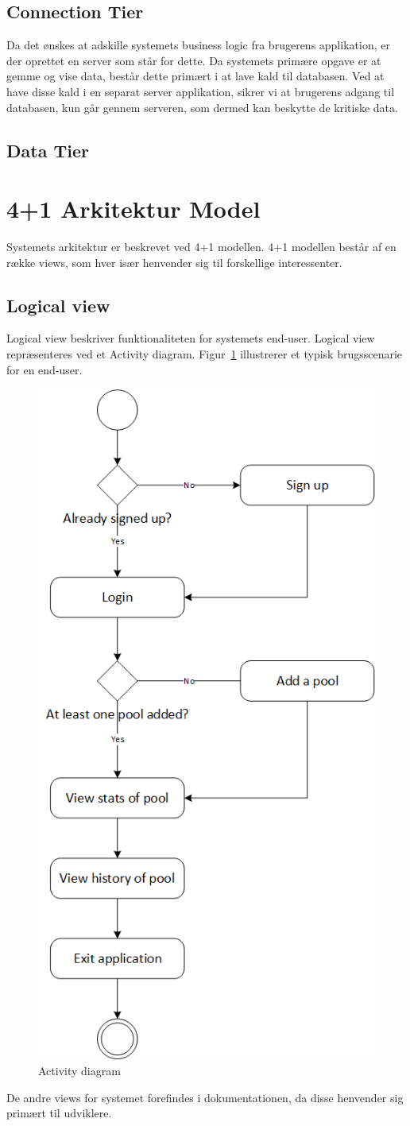 \subsection{Connection Tier}\label{sec:Connectiontier}
Da det ønskes at adskille systemets business logic fra brugerens applikation, er der oprettet en server som står for dette. Da systemets primære opgave er at gemme og vise data, består dette primært i at lave kald til databasen. Ved at have disse kald i en separat server applikation, sikrer vi at brugerens adgang til databasen, kun går gennem serveren, som dermed kan beskytte de kritiske data.

\subsection{Data Tier}

\section{4+1 Arkitektur Model}
Systemets arkitektur er beskrevet ved 4+1 modellen. 4+1 modellen består af en række views, som hver især henvender sig til forskellige interessenter.

\subsection{Logical view}
Logical view beskriver funktionaliteten for systemets end-user. Logical view repræsenteres ved et Activity diagram. Figur~\ref{fig:ActivityDiagram} illustrerer et typisk brugsscenarie for en end-user. 
\begin{figure}
\centering
\includegraphics[width=0.55\linewidth]{figs/arkitektur/ActivityDiagram.PNG}
\caption{Activity diagram}
\label{fig:ActivityDiagram}
\end{figure}

De andre views for systemet forefindes i dokumentationen, da disse henvender sig primært til udviklere.
